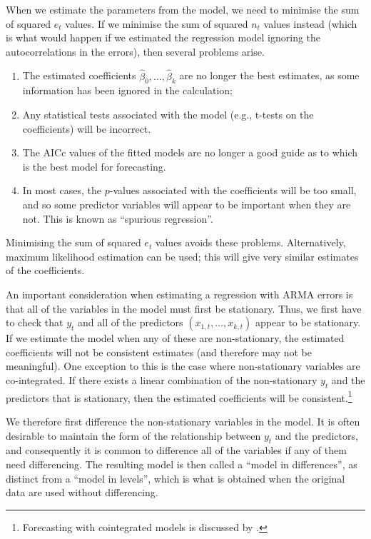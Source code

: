 \documentclass[]{book}
\providecommand{\tightlist}{%
  \setlength{\itemsep}{0pt}\setlength{\parskip}{0pt}}
\let\rmarkdownfootnote\footnote%
\def\footnote{\protect\rmarkdownfootnote}
\begin{document}
When we estimate the parameters from the model, we need to minimise the sum of squared \(e_t\) values. If we minimise the sum of squared \(n_t\) values instead (which is what would happen if we estimated the regression model ignoring the autocorrelations in the errors), then several problems arise.

\begin{enumerate}
\def\labelenumi{\arabic{enumi}.}
\tightlist
\item
  The estimated coefficients \(\hat{\beta}_0,\dots,\hat{\beta}_k\) are no longer the best estimates, as some information has been ignored in the calculation;
\item
  Any statistical tests associated with the model (e.g., t-tests on the coefficients) will be incorrect.
\item
  The AICc values of the fitted models are no longer a good guide as to which is the best model for forecasting.
\item
  In most cases, the \(p\)-values associated with the coefficients will be too small, and so some predictor variables will appear to be important when they are not. This is known as ``spurious regression''.
\end{enumerate}

Minimising the sum of squared \(e_t\) values avoids these problems. Alternatively, maximum likelihood estimation can be used; this will give very similar estimates of the coefficients.

An important consideration when estimating a regression with ARMA errors is that all of the variables in the model must first be stationary. Thus, we first have to check that \(y_t\) and all of the predictors \((x_{1,t},\dots,x_{k,t})\) appear to be stationary. If we estimate the model when any of these are non-stationary, the estimated coefficients will not be consistent estimates (and therefore may not be meaningful). One exception to this is the case where non-stationary variables are co-integrated. If there exists a linear combination of the non-stationary \(y_t\) and the predictors that is stationary, then the estimated coefficients will be consistent.\footnote{Forecasting with cointegrated models is discussed by \citet{Harris03}.}

We therefore first difference the non-stationary variables in the model. It is often desirable to maintain the form of the relationship between \(y_t\) and the predictors, and consequently it is common to difference all of the variables if any of them need differencing. The resulting model is then called a ``model in differences'', as distinct from a ``model in levels'', which is what is obtained when the original data are used without differencing.
\end{document}
